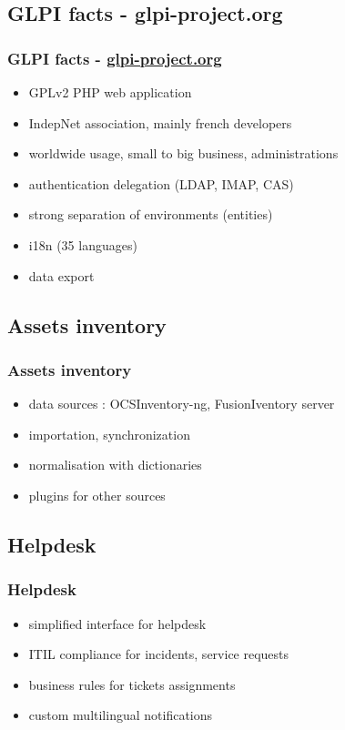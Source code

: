 \documentclass{beamer}
\begin{document}
\subsection{GLPI facts - glpi-project.org}
\begin{frame}
\frametitle{GLPI facts - \href{http://glpi-project.org}{glpi-project.org}}
\begin{itemize}
%
\item GPLv2 PHP web application
\item IndepNet association, mainly french developers
\item worldwide usage, small to big business, administrations
\item authentication delegation (LDAP, IMAP, CAS)
\item strong separation of environments (entities)
\item i18n (35 languages)
\item data export
%
\end{itemize}
\end{frame}

\subsection{Assets inventory}

\begin{frame}
\frametitle{Assets inventory}

\begin{itemize}
%
\item data sources : OCSInventory-ng, FusionIventory server
\item importation, synchronization
\item normalisation with dictionaries
\item plugins for other sources
%
\end{itemize}
\end{frame}
\subsection{Helpdesk}
\begin{frame}
\frametitle{Helpdesk}
%
\begin{itemize}
%
\item simplified interface for helpdesk
\item ITIL compliance for incidents, service requests
\item business rules for tickets assignments
\item custom multilingual notifications
%
\end{itemize}
\end{frame}
\end{document}
